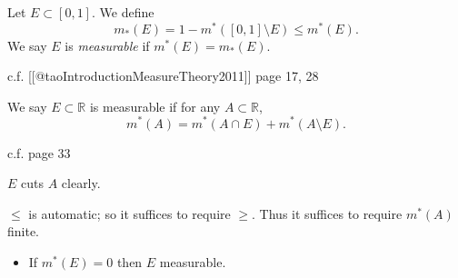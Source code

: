 \begin{definition}
	Let $E \subset [0,1]$. We define
	\[
		m_*(E) = 1 - m^*([0,1] \setminus E) \le  m^*(E)
	.\] 
	We say $E$ is \textit{measurable} if $m^*(E) = m_*(E)$.
\end{definition}
c.f. [[@taoIntroductionMeasureTheory2011]] page 17, 28

\begin{definition}
	We say $E \subset \mathbb{R}$ is measurable if for any $A \subset \mathbb{R}$, 
	\[
		m^*(A) = m^*(A \cap E) + m^*(A \setminus E)
	.\] 
\end{definition}
c.f. page 33
\begin{intuition}
	$E$ cuts $A$ clearly.
\end{intuition}

\begin{remark}
	$\le $ is automatic; so it suffices to require $\ge $. Thus it suffices to require $m^*(A)$ finite.
\end{remark}

\begin{example}
	\begin{itemize}
		\item If $m^*(E) = 0$ then $E$ measurable.
	\end{itemize}
\end{example}

